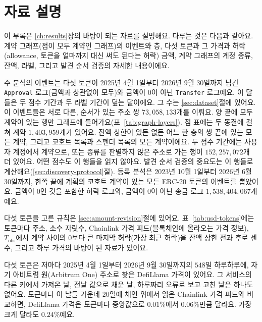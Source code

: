 \section{자료 설명}
\label{ch:appendix-data}

이 부록은 \ref{ch:results}장의 바탕이 되는 자료를 설명해요. 다루는 것은 다음과 같아요. 계약 그래프(점이 모두 계약인 그래프)의 이벤트와 층, 다섯 토큰과 그 가격과 허락(allowance, 토큰을 얼마까지 대신 써도 된다는 허락) 금액, 계약 그래프의 계정 종류, 잔액, 라벨, 그리고 발견 순서 검증의 자세한 내용이에요.


주 분석의 이벤트는 다섯 토큰이 2025년 4월 1일부터 2026년 9월 30일까지 남긴 \texttt{Approval} 로그(금액과 상관없이 모두)와 금액이 0이 아닌 \texttt{Transfer} 로그예요. 이 달들은 두 점수 기간과 두 라벨 기간이 덮는 달이에요. 그 수는 \ref{sec:dataset}절에 있어요. 이 이벤트들은 서로 다른, 순서가 있는 주소 쌍 $73{,}058{,}133$개를 이뤄요. 양 끝에 모두 계약이 있는 행만 그래프에 들어가요(표~\ref{tab:graph-layers}). 점 표에는 두 동결에 걸쳐 계약 $1{,}403{,}959$개가 있어요. 잔액 상한이 있든 없든 어느 한 층의 쌍 끝에 있는 모든 계약, 그리고 코호트 목록과 스펜더 목록의 모든 계약이에요. 두 점수 기간에는 사용자 계정에서 계약으로, 또는 종류를 판별하지 않은 주소로 가는 행이 $152{,}257{,}072$개 더 있어요. 어떤 점수도 이 행들을 읽지 않아요. 발견 순서 검증의 중요도는 이 행들로 계산해요(\ref{sec:discovery-protocol}절). 등록 분석은 2023년 10월 1일부터 2026년 6월 30일까지, 한쪽 끝에 계획의 코호트 계약이 있는 모든 ERC-20 토큰의 이벤트를 뽑았어요. 금액이 0인 것을 포함한 허락 로그와, 금액이 0이 아닌 송금 로그 $1{,}538{,}404{,}067$개예요.


다섯 토큰을 고른 규칙은 \ref{sec:amount-revision}절에 있어요. 표~\ref{tab:usd-tokens}에는 토큰마다 주소, 소수 자릿수, Chainlink 가격 피드(블록체인에 올라오는 가격 정보), $T_{\mathrm{obs}}$에서 계약 사이의 0보다 큰 마지막 허락(가장 최근 허락)을 잔액 상한 전과 후로 센 수, 그리고 하루 가격의 바탕이 된 자료가 있어요.



다섯 토큰은 저마다 2025년 4월 1일부터 2026년 9월 30일까지의 $548$일 하루하루에, 자기 아비트럼 원(Arbitrum One) 주소로 찾은 DefiLlama 가격이 있어요. 그 서비스의 다른 키에서 가져온 날, 전날 값으로 채운 날, 하루짜리 오류로 보고 고친 날은 하나도 없어요. 토큰마다 이 날들 가운데 $20$일에 체인 위에서 읽은 Chainlink 가격 피드와 비교하면, DefiLlama 가격은 토큰마다 중앙값으로 $0.01\%$에서 $0.06\%$만큼 달라요. 가장 크게 달라도 $0.24\%$예요.

